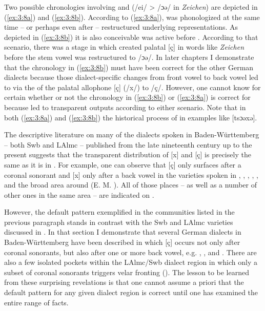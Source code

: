 Two possible chronologies involving  and  (/ei/ > /ɔə/ in \textit{Zeichen}) are depicted in (\ref{ex:3:8a}) and (\ref{ex:3:8b}). According to (\ref{ex:3:8a}),  was phonologized at the same time -- or perhaps even after --  restructured underlying representations. As depicted in (\ref{ex:3:8b}) it is also conceivable  was active before . According to that scenario, there was a stage in which  created palatal [ç] in words like \textit{Zeichen} before the stem vowel was restructured to /ɔə/. In later chapters I demonstrate that the chronology in (\ref{ex:3:8b}) must have been correct for the other German dialects because those dialect-specific changes from front vowel to back vowel led to  via the  of the palatal allophone [ç] (/x/) to /ç/. However, one cannot know for certain whether or not the chronology in (\ref{ex:3:8b}) or (\ref{ex:3:8a}) is correct for  because  led to transparent outputs according to either scenario. Note that in both (\ref{ex:3:8a}) and (\ref{ex:3:8b}) the historical process of    in examples like [tsɔəxə].

The descriptive literature on many of the dialects spoken in Baden-Würt\-tem\-berg -- both Swb and LAlmc -- published from the late nineteenth century up to the present suggests that the transparent distribution of [x] and [ç] is precisely the same as it is in . For example, one can observe that [ç] only surfaces after a coronal sonorant and [x] only after a back vowel in the varieties spoken in  \citep{Kauffmann1887, Kauffmann1890},  \citep{Heilig1897},  \citep{Sexauer1927},  \citep{Baur1967},  \citep{Frey1975}, and the broad area around 
(E. M. \citealt[55--56]{Hall1991}). All of those places -- as well as a number of other ones in the same area -- are indicated on .

However, the default pattern exemplified in the communities listed in the previous paragraph stands in contrast with the Swb and LAlmc varieties discussed in . In that section I demonstrate that several German dialects in Baden-Württemberg have been described in which [ç] occurs not only after coronal sonorants, but also after one or more back vowel, e.g.  \citep{Strohmaier1930},  \citep{Müller1911}, and  \citep{Dreher1919}. There are also a few isolated pockets within the LAlmc/Swb dialect region in which only a subset of coronal sonorants triggers velar fronting (). The lesson to be learned from these surprising revelations is that one cannot assume a priori that the default pattern for any given dialect region is correct until one has examined the entire range of facts.

